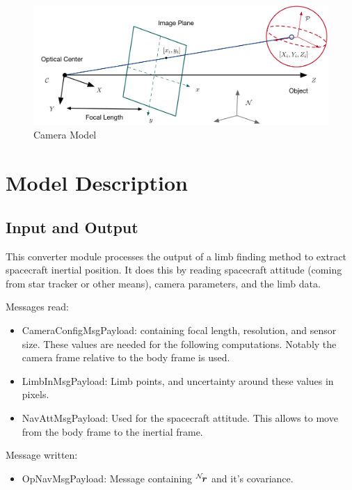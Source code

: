 

\begin{figure}[H]
	\centerline{
		\includegraphics{Figures/CameraGeometry}
	}
	\caption{Camera Model}
	\label{fig:camera}
\end{figure}

\section{Model Description}

\subsection{Input and Output}

This converter module processes the output of a limb finding method to extract spacecraft inertial position. It does this by reading spacecraft attitude (coming from star tracker or other means), camera parameters, and the limb data. 

Messages read:

\begin{itemize}
\item CameraConfigMsgPayload: containing focal length, resolution, and sensor size. These values are needed for the following computations. Notably the camera frame relative to the body frame is used.
\item LimbInMsgPayload: Limb points, and uncertainty around these values in pixels. 
\item NavAttMsgPayload: Used for the spacecraft attitude. This allows to move from the body frame to the inertial frame.
\end{itemize}

Message written:
\begin{itemize}
\item OpNavMsgPayload: Message containing $\leftexp{N}{\bm r}$ and it's covariance.
\end{itemize}

